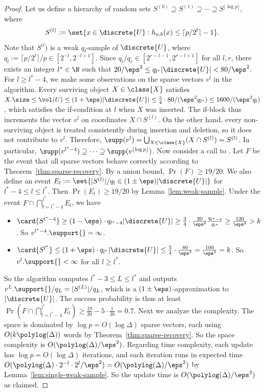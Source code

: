 %
\begin{proof}
    Let us define a hierarchy of random sets $S^{(0)} \supseteq S^{(1)} \supseteq \cdots \supseteq S^{\lfloor \log p \rfloor}$, where
    \[ S^{(l)} := \set{ x \in \discrete{U} : h_{a,b}(x) \leq \lceil p/2^l \rceil - 1 }. \]
    Note that $S^{(l})$ is a weak $q_l$-sample of $\discrete{U}$, where $q_l := \lceil p/2^l \rceil / p \in [2^{-l}, 2^{-l+1}]$. Since $q_l/q_r \in [2^{r-l-1}, 2^{r-l+1}]$ for all $l,r$, there exists an integer $l^* \in \N$ such that $20/\eps^2 \leq q_{l^*} |\discrete{U}| < 80/\eps^2$.
%
    For $l \geq l^*-4$, we make some observations on the sparse vectors $v^l$ in the algorithm. Every surviving object $X \in \class{X}$ satisfies $X.\size \leq \vol(U) \leq (1+\eps) |\discrete{U}| \leq \frac{5}{4} \cdot 80 / (\eps^2 q_{l^*}) \leq 1600 / (\eps^2 q_l)$, which satisfies the if-condition at $l$ when $X$ was inserted. The if-block thus increments the vector $v^l$ on coordinates $X \cap S^{(l)}$. On the other hand, every non-surviving object is treated consistently during insertion and deletion, so it does not contribute to $v^l$. Therefore, $\supp(v^l) = \bigcup_{X \in \class{X}} (X \cap S^{(l)}) = S^{(l)}$. In particular, $\supp(v^{l^*-4}) \supseteq \cdots \supseteq \supp(v^{\lfloor \log p \rfloor})$.
%
    Now consider a call to \est{}. Let $F$ be the event that all sparse vectors behave correctly according to Theorem~\ref{thm:sparse-recovery}. By a union bound, $\Pr(F) \geq 19/20$. We also define an event $E_l := \set{|S^{(l)}|/q_l \in (1 \pm \eps) |\discrete{U}|}$ for $l^*-4 \leq l \leq l^*$. Then $\Pr(E_l) \geq 19/20$ by Lemma~\ref{lem:weak-sample}. Under the event $F \cap \bigcap_{l=l^*-4}^{l^*} E_l$, we have
    \begin{itemize}
        \item $\card{S^{l^*-4}} \geq (1-\eps) \cdot q_{l^*-4} |\discrete{U}| \geq \frac{3}{4} \cdot \frac{20}{\eps^2} \frac{q_{l^*-4}}{q_{l^*}} \geq \frac{120}{\eps^2} > k$. So $v^{l^*-4}.\support{} = \infty$.
        \item $\card{S^{l^*}} \leq (1+\eps) \cdot q_{l^*} |\discrete{U}| \leq \frac{5}{4} \cdot \frac{80}{\eps^2} = \frac{100}{\eps^2} = k$. So $v^l.\support{} < \infty$ for all $l \geq l^*$.
    \end{itemize}
    So the algorithm computes $l^* - 3 \leq L \leq l^*$ and outputs $v^L.\support{}/q_L = |S^{(L)}|/q_L$, which is a $(1 \pm \eps)$-approximation to $|\discrete{U}|$. The success probability is thus at least $\Pr( F \cap \bigcap_{l=l^*-4}^{l^*} E_l ) \geq \frac{19}{20} - 5 \cdot \frac{1}{20} = 0.7$.
%
    Next we analyze the complexity. The space is dominated by $\log p = O(\log \Delta)$ sparse vectors, each using $O(k\polylog(\Delta))$ words by Theorem~\ref{thm:sparse-recovery}. So the space complexity is $O(\polylog(\Delta)/\eps^2)$. Regarding time complexity, each update has $\log p = O(\log \Delta)$ iterations, and each iteration runs in expected time $O(\polylog(\Delta) \cdot 2^{-l} \cdot 2^l/\eps^2) = O(\polylog(\Delta) / \eps^2)$ by Lemma~\ref{lem:single-weak-sample}. So the update time is $O(\polylog(\Delta) / \eps^2)$ as claimed.
\end{proof}
